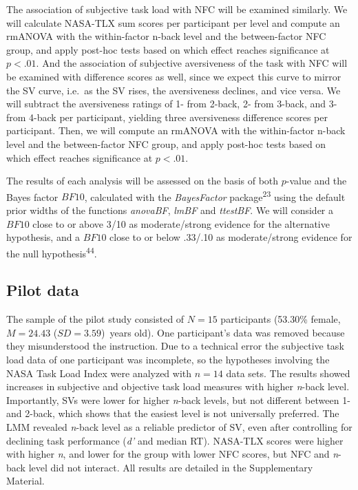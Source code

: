 \documentclass[
  man,floatsintext]{apa6}
\begin{document}
The association of subjective task load with NFC will be examined similarly.
We will calculate NASA-TLX sum scores per participant per level and compute an rmANOVA with the within-factor n-back level and the between-factor NFC group, and apply post-hoc tests based on which effect reaches significance at \(p<.01\).
And the association of subjective aversiveness of the task with NFC will be examined with difference scores as well, since we expect this curve to mirror the SV curve, i.e.~as the SV rises, the aversiveness declines, and vice versa.
We will subtract the aversiveness ratings of 1- from 2-back, 2- from 3-back, and 3- from 4-back per participant, yielding three aversiveness difference scores per participant.
Then, we will compute an rmANOVA with the within-factor n-back level and the between-factor NFC group, and apply post-hoc tests based on which effect reaches significance at \(p<.01\).

The results of each analysis will be assessed on the basis of both \(p\)-value and the Bayes factor \(BF10\), calculated with the \emph{BayesFactor} package\textsuperscript{23} using the default prior widths of the functions \emph{anovaBF}, \emph{lmBF} and \emph{ttestBF}.
We will consider a \(BF10\) close to or above 3/10 as moderate/strong evidence for the alternative hypothesis, and a \(BF10\) close to or below .33/.10 as moderate/strong evidence for the null hypothesis\textsuperscript{44}.

\hypertarget{pilot-data}{%
\subsection{Pilot data}\label{pilot-data}}

The sample of the pilot study consisted of \(N=15\) participants (53.30\% female, \(M=24.43\) (\(SD=3.59\))~years old).
One participant's data was removed because they misunderstood the instruction.
Due to a technical error the subjective task load data of one participant was incomplete, so the hypotheses involving the NASA Task Load Index were analyzed with \(n=14\) data sets.
The results showed increases in subjective and objective task load measures with higher \emph{n}-back level.
Importantly, SVs were lower for higher \emph{n}-back levels, but not different between 1- and 2-back, which shows that the easiest level is not universally preferred.
The LMM revealed \emph{n}-back level as a reliable predictor of SV, even after controlling for declining task performance (\emph{d'} and median RT).
NASA-TLX scores were higher with higher \emph{n}, and lower for the group with lower NFC scores, but NFC and \emph{n}-back level did not interact.
All results are detailed in the Supplementary Material.
\end{document}

